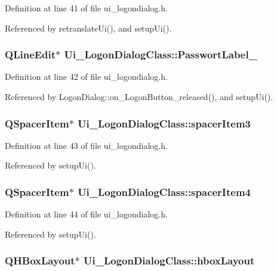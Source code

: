 Definition at line 41 of file ui\_\-logondialog.h.

Referenced by retranslateUi(), and setupUi().\hypertarget{class_ui___logon_dialog_class_db8d5808ae6a2d8c3fa7ee4c6376ce00}{
\subsubsection[PasswortLabel\_\-2]{\setlength{\rightskip}{0pt plus 5cm}QLineEdit$\ast$ {\bf Ui\_\-LogonDialogClass::PasswortLabel\_}}}
\label{class_ui___logon_dialog_class_db8d5808ae6a2d8c3fa7ee4c6376ce00}




Definition at line 42 of file ui\_\-logondialog.h.

Referenced by LogonDialog::on\_\-LogonButton\_\-released(), and setupUi().\hypertarget{class_ui___logon_dialog_class_afa5df6139db9af18a4788bbe7004453}{
\subsubsection[spacerItem3]{\setlength{\rightskip}{0pt plus 5cm}QSpacerItem$\ast$ {\bf Ui\_\-LogonDialogClass::spacerItem3}}}
\label{class_ui___logon_dialog_class_afa5df6139db9af18a4788bbe7004453}




Definition at line 43 of file ui\_\-logondialog.h.

Referenced by setupUi().\hypertarget{class_ui___logon_dialog_class_55ec39807e963fa89e3f0b6af5342118}{
\subsubsection[spacerItem4]{\setlength{\rightskip}{0pt plus 5cm}QSpacerItem$\ast$ {\bf Ui\_\-LogonDialogClass::spacerItem4}}}
\label{class_ui___logon_dialog_class_55ec39807e963fa89e3f0b6af5342118}




Definition at line 44 of file ui\_\-logondialog.h.

Referenced by setupUi().\hypertarget{class_ui___logon_dialog_class_f31ca5cba4985b8ce2f12147194435b2}{
\subsubsection[hboxLayout]{\setlength{\rightskip}{0pt plus 5cm}QHBoxLayout$\ast$ {\bf Ui\_\-LogonDialogClass::hboxLayout}}}
\label{class_ui___logon_dialog_class_f31ca5cba4985b8ce2f12147194435b2}




